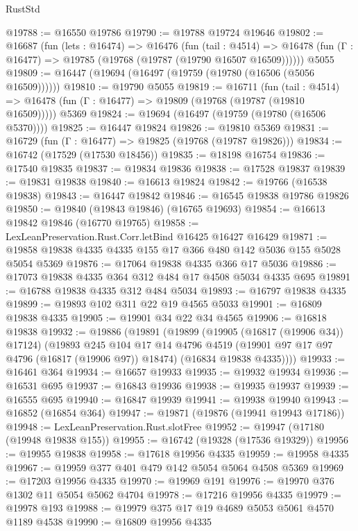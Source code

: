 \begin{lexlean}{RustStd}
\begin{coremodule}
@19788 := @16550 @19786
@19790 := @19788 @19724 @19646
@19802 := @16687
    (fun (lets : @16474) =>
    @16476
      (fun (tail : @4514) =>
      @16478 (fun (Γ : @16477) => @19785 (@19768 (@19787 (@19790 @16507 @16509))))))
    @5055
@19809 := @16447 (@19694 (@16497 (@19759 (@19780 (@16506 (@5056 @16509))))))
@19810 := @19790 @5055
@19819 := @16711
    (fun (tail : @4514) => @16478 (fun (Γ : @16477) => @19809 (@19768 (@19787 (@19810 @16509)))))
    @5369
@19824 := @19694 (@16497 (@19759 (@19780 (@16506 @5370))))
@19825 := @16447 @19824
@19826 := @19810 @5369
@19831 := @16729 (fun (Γ : @16477) => @19825 (@19768 (@19787 @19826)))
@19834 := @16742 (@17529 (@17530 @18456))
@19835 := @18198 @16754
@19836 := @17540 @19835
@19837 := @19834 @19836
@19838 := @17528 @19837
@19839 := @19831 @19838
@19840 := @16613 @19824
@19842 := @19766 (@16538 @19838)
@19843 := @16447 @19842
@19846 := @16545 @19838 @19786 @19826
@19850 := @19840 (@19843 @19846) (@16765 @19693)
@19854 := @16613 @19842 @19846 (@16770 @19765)
@19858 := LexLeanPreservation.Rust.Corr.letBind @16425 @16427 @16429
@19871 := @19858 @19838 @4335 @4335 @155 @17 @366 @480 @142 @5036 @155 @5028 @5054 @5369
@19876 := @17064 @19838 @4335 @366 @17 @5036
@19886 := @17073 @19838 @4335 @364 @312 @484 @17 @4508 @5034 @4335 @695
@19891 := @16788 @19838 @4335 @312 @484 @5034
@19893 := @16797 @19838 @4335
@19899 := @19893 @102 @311 @22 @19 @4565 @5033
@19901 := @16809 @19838 @4335
@19905 := @19901 @34 @22 @34 @4565
@19906 := @16818 @19838
@19932 := @19886
    (@19891
      (@19899
        (@19905 (@16817 (@19906 @34)) @17124)
        (@19893
          @245
          @104
          @17
          @14
          @4796
          @4519
          (@19901 @97 @17 @97 @4796 (@16817 (@19906 @97)) @18474)
          (@16834 @19838 @4335))))
@19933 := @16461 @364
@19934 := @16657 @19933
@19935 := @19932 @19934
@19936 := @16531 @695
@19937 := @16843 @19936
@19938 := @19935 @19937
@19939 := @16555 @695
@19940 := @16847 @19939
@19941 := @19938 @19940
@19943 := @16852 (@16854 @364)
@19947 := @19871 (@19876 (@19941 @19943 @17186))
@19948 := LexLeanPreservation.Rust.slotFree
@19952 := @19947 (@17180 (@19948 @19838 @155))
@19955 := @16742 (@19328 (@17536 @19329))
@19956 := @19955 @19838
@19958 := @17618 @19956 @4335
@19959 := @19958 @4335
@19967 := @19959 @377 @401 @479 @142 @5054 @5064 @4508 @5369
@19969 := @17203 @19956 @4335
@19970 := @19969 @191
@19976 := @19970 @376 @1302 @11 @5054 @5062 @4704
@19978 := @17216 @19956 @4335
@19979 := @19978 @193
@19988 := @19979 @375 @17 @19 @4689 @5053 @5061 @4570 @1189 @4538
@19990 := @16809 @19956 @4335

\end{coremodule}
\end{lexlean}
